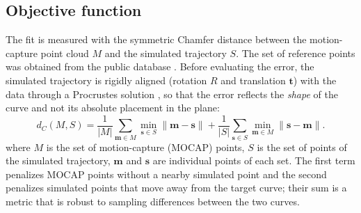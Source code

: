 \documentclass[conference]{IEEEtran}
\begin{document}
\subsection{Objective function}
The fit is measured with the symmetric Chamfer distance \cite{ref_chamfer}
between the motion-capture point cloud $M$ and the simulated trajectory $S$. The
set of reference points was obtained from the public database
\cite{ref_pizzolato}. Before evaluating the error, the simulated trajectory is
rigidly aligned (rotation $R$ and translation $\mathbf{t}$) with the data through
a Procrustes solution \cite{ref_procrustes}, so that the error reflects the
\emph{shape} of the curve and not its absolute placement in the plane:
\begin{equation}
d_C(M,S)=\frac{1}{|M|}\!\sum_{\mathbf{m}\in M}\!\min_{\mathbf{s}\in S}\lVert \mathbf{m}-\mathbf{s}\rVert
+\frac{1}{|S|}\!\sum_{\mathbf{s}\in S}\!\min_{\mathbf{m}\in M}\lVert \mathbf{s}-\mathbf{m}\rVert .
\label{eq:chamfer}
\end{equation}
where $M$ is the set of motion-capture (MOCAP) points, $S$ is the set of points
of the simulated trajectory, $\mathbf{m}$ and $\mathbf{s}$ are individual points
of each set. The first term penalizes MOCAP points without a nearby simulated
point and the second penalizes simulated points that move away from the target
curve; their sum is a metric that is robust to sampling differences between the
two curves.
\end{document}
